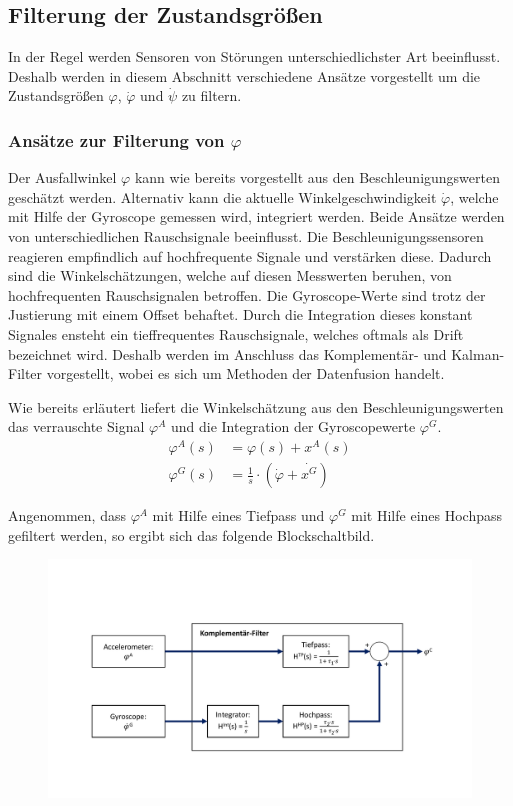 \subsection{Filterung der Zustandsgrößen}
In der Regel werden Sensoren von Störungen unterschiedlichster Art beeinflusst. Deshalb werden in diesem Abschnitt verschiedene Ansätze vorgestellt um die Zustandsgrößen $\varphi$, $\dot{\varphi}$ und $\dot{\psi}$ zu filtern. 

\subsubsection{Ansätze zur Filterung von $\varphi$}
Der Ausfallwinkel $\varphi$ kann wie bereits vorgestellt aus den Beschleunigungswerten geschätzt werden. Alternativ kann die aktuelle Winkelgeschwindigkeit $\dot{\varphi}$, welche mit Hilfe der Gyroscope gemessen wird, integriert werden. Beide Ansätze werden von unterschiedlichen Rauschsignale beeinflusst. Die Beschleunigungssensoren reagieren empfindlich auf hochfrequente Signale und verstärken diese. Dadurch sind die Winkelschätzungen, welche auf diesen Messwerten beruhen, von hochfrequenten Rauschsignalen betroffen. 
Die Gyroscope-Werte sind trotz der Justierung mit einem Offset behaftet. Durch die Integration dieses konstant Signales ensteht ein tieffrequentes Rauschsignale, welches oftmals als Drift bezeichnet wird. 
Deshalb werden im Anschluss das Komplementär- und Kalman-Filter vorgestellt, wobei es sich um Methoden der Datenfusion handelt.

Wie bereits erläutert liefert die Winkelschätzung aus den Beschleunigungswerten das verrauschte Signal $\varphi^A$ und die Integration der Gyroscopewerte $\varphi^G$.
\begin{equation}
\begin{split}
\varphi^A(s) &= \varphi(s) + x^A(s) \\
\varphi^G(s) &= \frac{1}{s} \cdot (\dot{\varphi} + \dot{x^G}) 
\end{split}
\end{equation}

Angenommen, dass $\varphi^A$ mit Hilfe eines Tiefpass und $\varphi^G$ mit Hilfe eines Hochpass gefiltert werden, so ergibt sich das folgende Blockschaltbild.

\begin{figure}[!h]
\includegraphics[scale=0.5,trim={0 3cm 0 4cm},clip]{img/Komp_CuBa_1D}
\end{figure}

